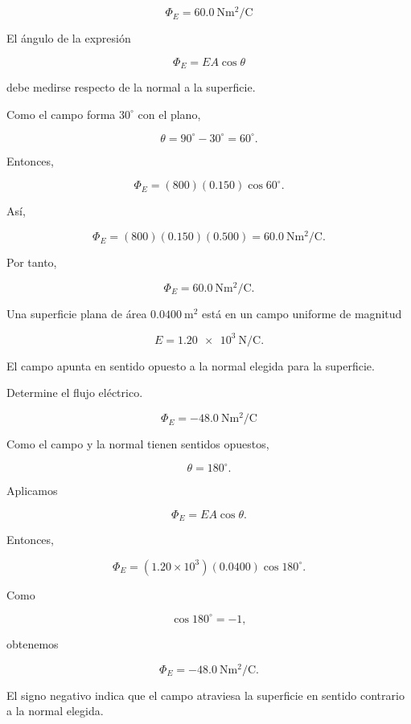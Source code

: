 \begin{respuesta}

\[
\boxed{\Phi_E=\SI{60.0}{\newton\metre\squared\per\coulomb}}
\]

\end{respuesta}

\begin{explicacion}

El ángulo de la expresión

\[
\Phi_E=EA\cos\theta
\]

debe medirse respecto de la normal a la superficie.

Como el campo forma \(30^\circ\) con el plano,

\[
\theta=90^\circ-30^\circ=60^\circ.
\]

Entonces,

\[
\Phi_E=(800)(0.150)\cos60^\circ.
\]

Así,

\[
\Phi_E=(800)(0.150)(0.500)
=\SI{60.0}{\newton\metre\squared\per\coulomb}.
\]

Por tanto,

\[
\boxed{\Phi_E=\SI{60.0}{\newton\metre\squared\per\coulomb}}.
\]

\end{explicacion}


\begin{ejercicio}

Una superficie plana de área \(\SI{0.0400}{\metre\squared}\) está en un campo
uniforme de magnitud

\[
E=\SI{1.20e3}{\newton\per\coulomb}.
\]

El campo apunta en sentido opuesto a la normal elegida para la superficie.

Determine el flujo eléctrico.

\end{ejercicio}

\begin{respuesta}

\[
\boxed{\Phi_E=-\SI{48.0}{\newton\metre\squared\per\coulomb}}
\]

\end{respuesta}

\begin{explicacion}

Como el campo y la normal tienen sentidos opuestos,

\[
\theta=180^\circ.
\]

Aplicamos

\[
\Phi_E=EA\cos\theta.
\]

Entonces,

\[
\Phi_E=(1.20\times10^3)(0.0400)\cos180^\circ.
\]

Como

\[
\cos180^\circ=-1,
\]

obtenemos

\[
\boxed{\Phi_E=-\SI{48.0}{\newton\metre\squared\per\coulomb}}.
\]

El signo negativo indica que el campo atraviesa la superficie en sentido contrario
a la normal elegida.

\end{explicacion}


